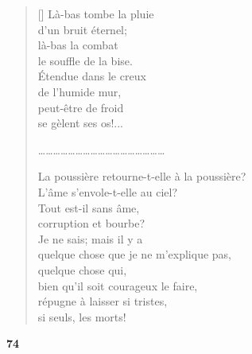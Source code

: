 \documentclass[a4paper,12pt]{book}
\begin{document}
\begin{verse}[\versewidth]
  Là-bas tombe la pluie \\
  d'un bruit éternel; \\
  là-bas la combat \\
  le souffle de la bise. \\
  Étendue dans le creux \\
  de l'humide mur, \\
  peut-être de froid \\
  se gèlent ses os!...

\ldots\ldots\ldots\ldots\ldots\ldots\ldots\ldots\ldots\ldots\ldots\ldots\ldots\ldots\ldots\ldots\ldots

  La poussière retourne-t-elle à la poussière? \\
  L'âme s'envole-t-elle au ciel? \\
  Tout est-il sans âme, \\
  corruption et bourbe? \\
  Je ne sais; mais il y a \\
  quelque chose que je ne m'explique pas, \\
  quelque chose qui, \\
  bien qu'il soit courageux le faire, \\
  répugne à laisser si tristes, \\
  si seuls, les morts!
\end{verse}

\bigskip

\begin{center}
  \textbf{74}
\end{center}

\settowidth{\versewidth}{je la vis, au fond, confuse et blanche.}
\end{document}
